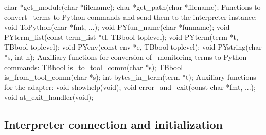 char *get_module(char *filename);
char *get_path(char *filename);
\nwendcode{}\nwdocspar
Functions to convert \TB\ terms to Python commands and send them to
the interpreter instance:
\nwenddocs{}\plusendmoddef\let\nwnotused=\nwoutput{}\nwstartdeflinemarkup{}\nwenddeflinemarkup
void ToPython(char *fmt, ...);
void PYfun_name(char *funname);
void PYterm_list(const term_list *tl, TBbool toplevel);
void PYterm(term *t, TBbool toplevel);
void PYenv(const env *e, TBbool toplevel);
void PYstring(char *s, int n);
\nwendcode{}\nwdocspar
Auxiliary functions for conversion of \TB\ monitoring terms to Python
commands:
\nwenddocs{}\plusendmoddef\let\nwnotused=\nwoutput{}\nwstartdeflinemarkup{}\nwenddeflinemarkup
TBbool is_to_tool_comm(char *s);
TBbool is_from_tool_comm(char *s);
int bytes_in_term(term *t);
\nwendcode{}\nwdocspar
Auxiliary functions for the adapter:
\nwenddocs{}\plusendmoddef\let\nwnotused=\nwoutput{}\nwstartdeflinemarkup{}\nwenddeflinemarkup
void showhelp(void);
void error_and_exit(const char *fmt, ...);
void at_exit_handler(void);
\nwendcode{}\nwdocspar

\subsection{Interpreter connection and initialization}

